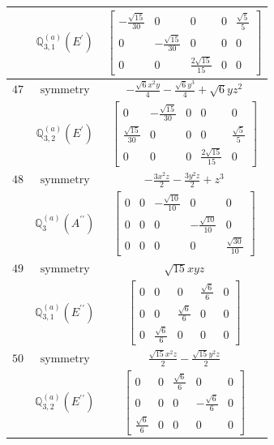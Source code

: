 \documentclass[fleqn,8pt,landscape]{jsarticle}
\begin{document}
\begin{longtable}{ccc}
$  $ & $ \mathbb{Q}_{3,1}^{(a)}(E^{\prime}) $ & $ \begin{bmatrix} - \frac{\sqrt{15}}{30} & 0 & 0 & 0 & \frac{\sqrt{5}}{5} \\ 0 & - \frac{\sqrt{15}}{30} & 0 & 0 & 0 \\ 0 & 0 & \frac{2 \sqrt{15}}{15} & 0 & 0 \end{bmatrix} $ \\ \hline
$ 47 $ & $ \text{symmetry} $ & $ - \frac{\sqrt{6} x^{2} y}{4} - \frac{\sqrt{6} y^{3}}{4} + \sqrt{6} y z^{2} $ \\
$  $ & $ \mathbb{Q}_{3,2}^{(a)}(E^{\prime}) $ & $ \begin{bmatrix} 0 & - \frac{\sqrt{15}}{30} & 0 & 0 & 0 \\ \frac{\sqrt{15}}{30} & 0 & 0 & 0 & \frac{\sqrt{5}}{5} \\ 0 & 0 & 0 & \frac{2 \sqrt{15}}{15} & 0 \end{bmatrix} $ \\ \hline
$ 48 $ & $ \text{symmetry} $ & $ - \frac{3 x^{2} z}{2} - \frac{3 y^{2} z}{2} + z^{3} $ \\
$  $ & $ \mathbb{Q}_{3}^{(a)}(A^{\prime\prime}) $ & $ \begin{bmatrix} 0 & 0 & - \frac{\sqrt{10}}{10} & 0 & 0 \\ 0 & 0 & 0 & - \frac{\sqrt{10}}{10} & 0 \\ 0 & 0 & 0 & 0 & \frac{\sqrt{30}}{10} \end{bmatrix} $ \\ \hline
$ 49 $ & $ \text{symmetry} $ & $ \sqrt{15} x y z $ \\
$  $ & $ \mathbb{Q}_{3,1}^{(a)}(E^{\prime\prime}) $ & $ \begin{bmatrix} 0 & 0 & 0 & \frac{\sqrt{6}}{6} & 0 \\ 0 & 0 & \frac{\sqrt{6}}{6} & 0 & 0 \\ 0 & \frac{\sqrt{6}}{6} & 0 & 0 & 0 \end{bmatrix} $ \\ \hline
$ 50 $ & $ \text{symmetry} $ & $ \frac{\sqrt{15} x^{2} z}{2} - \frac{\sqrt{15} y^{2} z}{2} $ \\
$  $ & $ \mathbb{Q}_{3,2}^{(a)}(E^{\prime\prime}) $ & $ \begin{bmatrix} 0 & 0 & \frac{\sqrt{6}}{6} & 0 & 0 \\ 0 & 0 & 0 & - \frac{\sqrt{6}}{6} & 0 \\ \frac{\sqrt{6}}{6} & 0 & 0 & 0 & 0 \end{bmatrix} $ \\ \hline

\end{longtable}
\end{document}
